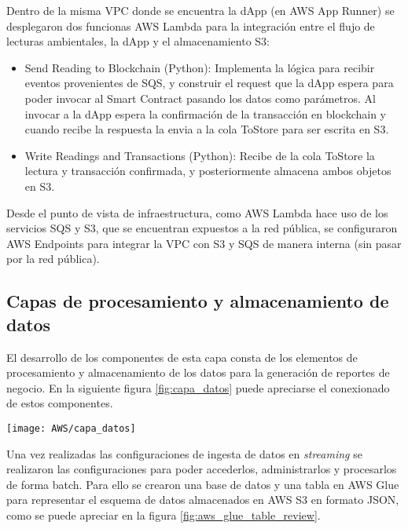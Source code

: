 Dentro de la misma VPC donde se encuentra la dApp (en AWS App Runner) se desplegaron dos funcionas AWS Lambda para la integración entre el flujo de lecturas ambientales, la dApp y el almacenamiento S3:

\begin{itemize}
	\item Send Reading to Blockchain (Python): Implementa la lógica para recibir eventos provenientes de SQS, y construir el request que la dApp espera para poder invocar al Smart Contract pasando los datos como parámetros. Al invocar a la dApp espera la confirmación de la transacción en blockchain y cuando recibe la respuesta la envia a la cola ToStore para ser escrita en S3.
	\item Write Readings and Transactions (Python): Recibe de la cola ToStore la lectura y transacción confirmada, y posteriormente almacena ambos objetos en S3.
\end{itemize}

Desde el punto de vista de infraestructura, como AWS Lambda hace uso de los servicios SQS y S3, que se encuentran expuestos a la red pública, se configuraron AWS Endpoints para integrar la VPC con S3 y SQS de manera interna (sin pasar por la red pública).


\subsection{Capas de procesamiento y almacenamiento de datos}


El desarrollo de los componentes de esta capa consta de los elementos de procesamiento y almacenamiento de los datos para la generación de reportes de negocio. En la siguiente figura \ref{fig:capa_datos} puede apreciarse el conexionado de estos componentes.


\begin{center}
   \texttt{[image: AWS/capa\_datos]}
   \label{fig:capa_datos}
\end{center}

Una vez realizadas las configuraciones de ingesta de datos en \textit{streaming} se realizaron las configuraciones para poder accederlos, administrarlos y procesarlos de forma batch.
Para ello se crearon una base de datos y una tabla en AWS Glue para representar el esquema de datos almacenados en AWS S3 en formato JSON, como se puede apreciar en la figura \ref{fig:aws_glue_table_review}.

